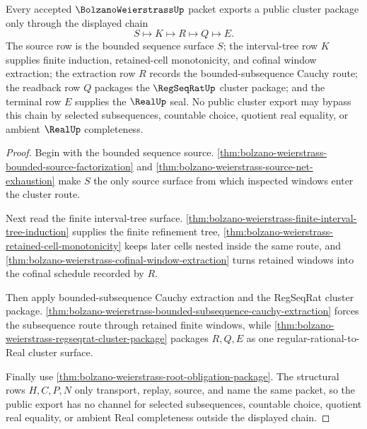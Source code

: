 \begin{theorem}
\label{thm:bolzano-weierstrass-public-cluster-export}
Every accepted $\BolzanoWeierstrassUp$ packet exports a public cluster package only through the displayed chain
$$
S \longmapsto K \longmapsto R \longmapsto Q \longmapsto E .
$$
The source row is the bounded sequence surface $S$; the interval-tree row $K$ supplies finite induction, retained-cell monotonicity, and cofinal window extraction; the extraction row $R$ records the bounded-subsequence Cauchy route; the readback row $Q$ packages the $\RegSeqRatUp$ cluster package; and the terminal row $E$ supplies the $\RealUp$ seal. No public cluster export may bypass this chain by selected subsequences, countable choice, quotient real equality, or ambient $\RealUp$ completeness.
\end{theorem}
\begin{proof}
Begin with the bounded sequence source. \autoref{thm:bolzano-weierstrass-bounded-source-factorization} and \autoref{thm:bolzano-weierstrass-source-net-exhaustion} make $S$ the only source surface from which inspected windows enter the cluster route.

Next read the finite interval-tree surface. \autoref{thm:bolzano-weierstrass-finite-interval-tree-induction} supplies the finite refinement tree, \autoref{thm:bolzano-weierstrass-retained-cell-monotonicity} keeps later cells nested inside the same route, and \autoref{thm:bolzano-weierstrass-cofinal-window-extraction} turns retained windows into the cofinal schedule recorded by $R$.

Then apply bounded-subsequence Cauchy extraction and the RegSeqRat cluster package. \autoref{thm:bolzano-weierstrass-bounded-subsequence-cauchy-extraction} forces the subsequence route through retained finite windows, while \autoref{thm:bolzano-weierstrass-regseqrat-cluster-package} packages $R,Q,E$ as one regular-rational-to-Real cluster surface.

Finally use \autoref{thm:bolzano-weierstrass-root-obligation-package}. The structural rows $H,C,P,N$ only transport, replay, source, and name the same packet, so the public export has no channel for selected subsequences, countable choice, quotient real equality, or ambient Real completeness outside the displayed chain.
\end{proof}


